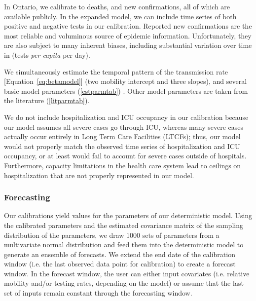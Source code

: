 \documentclass[12pt]{article}\usepackage[]{graphicx}\usepackage[]{color}
\begin{document}
In Ontario, we calibrate to deaths, and new confirmations, all of which are available publicly. 
In the expanded model, we can include time series of both positive and negative tests in our calibration. 
Reported new confirmations are the most reliable and voluminous source of epidemic information.
Unfortunately, they are also subject to many inherent biases, including substantial variation over time in  (\ie tests \emph{per capita} per day).

We simultaneously estimate the temporal pattern of the transmission rate [Equation~\eqref{eq:betamodel}] (two mobility intercept and three slopes), and several basic model parameters (\cref{estparmtab}) .
Other model parameters are taken from the literature (\cref{litparmtab}).

We do not include hospitalization and ICU occupancy in our calibration because our model assumes all severe cases go through ICU, whereas many severe cases actually occur entirely in Long Term Care Facilities (LTCFs); thus,
our model would not properly match the observed time series of hospitalization and ICU occupancy, or at least would fail to account for
severe cases outside of hospitals. Furthermore, capacity limitations in the health care system lead to ceilings on hospitalization that are
not properly represented in our model.

\subsubsection*{Forecasting}

Our calibrations yield values for the parameters of our deterministic model. 
Using the calibrated parameters and the estimated covariance matrix of the sampling distribution of the parameters, we draw 1000 sets of parameters from a multivariate normal distribution \cite{Bolk08,krinskyThree1991a} and feed them into the deterministic model to generate an ensemble of forecasts. We extend the end date of the calibration window (i.e. the last observed data point for calibration) to create a forecast window. In the forecast window, the user can either input covariates (i.e. relative mobility and/or testing rates, depending on the model) or assume that the last set of inputs remain constant through the forecasting window. 
\end{document}
